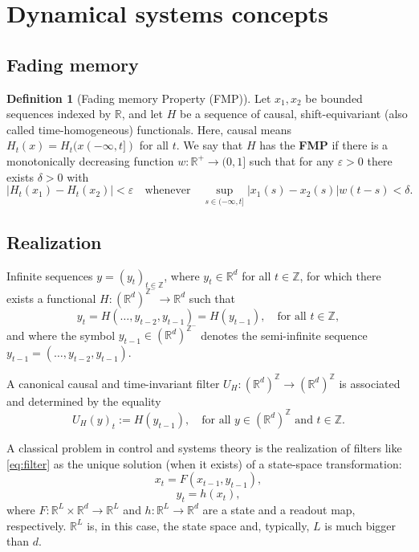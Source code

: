\documentclass{article}
\theoremstyle{definition}
\newtheorem{definition}{Definition}
\theoremstyle{remark}
\newcounter{ct}
\begin{document}
\section{Dynamical systems concepts}
\subsection{Fading memory}
\begin{definition}[Fading memory Property (FMP)]
Let $x_1, x_2$ be bounded sequences indexed by $\mathbb{R}$, and let $H$ be a sequence of causal, shift-equivariant (also called time-homogeneous) functionals.
Here, causal means $H_t(x) = H_t(x(-\infty,t])$ for all $t$.
We say that $H$ has the \textbf{FMP} if there is a monotonically decreasing function $w : \mathbb{R}^+ \to (0, 1]$ such that for any $\varepsilon > 0$ there exists $\delta > 0$ with 
\[
|H_t(x_1) - H_t(x_2)| < \varepsilon \quad \text{whenever} \quad \sup_{s \in (-\infty, t]} |x_1(s) - x_2(s)| w(t - s) < \delta.
\]
\end{definition}

\subsection{Realization}\label{sec:realization}

Infinite sequences \( y = (y_t)_{t \in \mathbb{Z}} \), where \( y_t \in \mathbb{R}^d \) for all \( t \in \mathbb{Z} \), for which there exists a functional \( H : (\mathbb{R}^d)^{\mathbb{Z}^-} \rightarrow \mathbb{R}^d \) such that 
\begin{equation}\label{eq:filter}
y_t = H(\ldots, y_{t-2}, y_{t-1}) = H\left( y_{t-1} \right), \quad \text{for all } t \in \mathbb{Z},
\end{equation}
and where the symbol \( y_{t-1} \in (\mathbb{R}^d)^{\mathbb{Z}^-} \) denotes the semi-infinite sequence \( y_{t-1} = (\ldots, y_{t-2}, y_{t-1}) \).

A canonical causal and time-invariant filter \( U_H : (\mathbb{R}^d)^{\mathbb{Z}} \rightarrow (\mathbb{R}^d)^{\mathbb{Z}} \) is associated and determined by the equality 
\[
U_H(y)_t := H\left( y_{t-1} \right), \quad \text{for all } y \in (\mathbb{R}^d)^{\mathbb{Z}} \text{ and } t \in \mathbb{Z}.
\]

A classical problem in control and systems theory is the realization of filters like \ref{eq:filter} as the unique solution (when it exists) of a state-space transformation:
\begin{equation}
x_t = F(x_{t-1}, y_{t-1}),
\end{equation}
\begin{equation}
y_t = h(x_t),
\end{equation}
where \( F : \mathbb{R}^L \times \mathbb{R}^d \rightarrow \mathbb{R}^L \) and \( h : \mathbb{R}^L \rightarrow \mathbb{R}^d \) are a state and a readout map, respectively. \( \mathbb{R}^L \) is, in this case, the state space and, typically, \( L \) is much bigger than \( d \).
\end{document}
